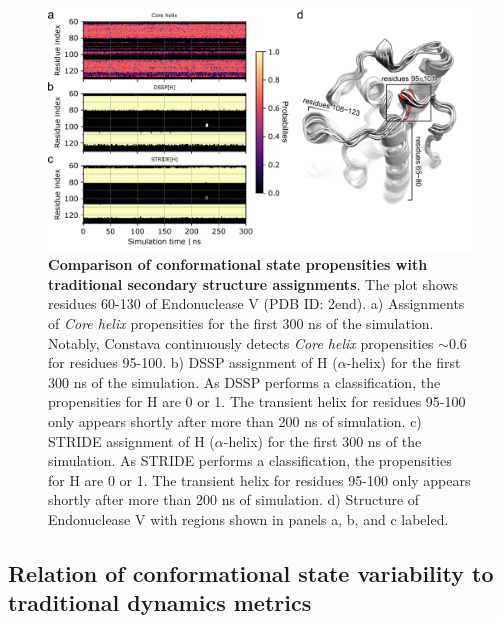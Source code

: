 \begin{figure}[ht!]
\includegraphics[width=\textwidth]{constava/figures_constava/figure4.pdf}
\caption{
    \textbf{Comparison of conformational state propensities with traditional secondary structure assignments}. The plot shows residues 60-130 of Endonuclease V (PDB ID: 2end).
    a) Assignments of \textit{Core helix} propensities for the first 300 ns of the simulation. Notably, Constava continuously detects \textit{Core helix} propensities $\sim 0.6$ for residues 95-100. 
    b) DSSP assignment of H ($\alpha$-helix) for the first 300 ns of the simulation. As DSSP performs a classification, the propensities for H are 0 or 1. The transient helix for residues 95-100 only appears shortly after more than 200 ns of simulation.
    c) STRIDE assignment of H ($\alpha$-helix) for the first 300 ns of the simulation. As STRIDE performs a classification, the propensities for H are 0 or 1. The transient helix for residues 95-100 only appears shortly after more than 200 ns of simulation.
    d) Structure of Endonuclease V with regions shown in panels a, b, and c labeled.}
\label{fig:dssp_vs_constava}
\end{figure}


\subsection{Relation of conformational state variability to traditional dynamics metrics} \label{section:ConfStateVar_vs_Dynamics}

